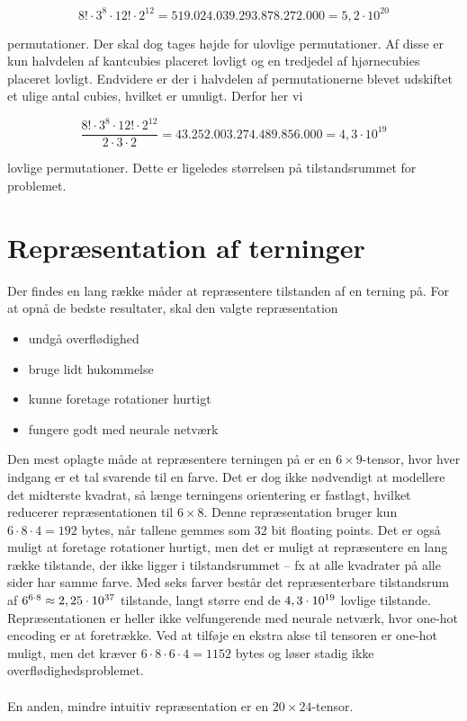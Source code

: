 \documentclass[../main.tex]{subfiles}
\begin{document}
$$8!\cdot3^8\cdot12!\cdot2^{12}=519.024.039.293.878.272.000=5,2\cdot10^{20}$$

permutationer. Der skal dog tages højde for ulovlige permutationer. Af disse er kun halvdelen af kantcubies placeret lovligt og en tredjedel af hjørnecubies placeret lovligt. Endvidere er der i halvdelen af permutationerne blevet udskiftet et ulige antal cubies, hvilket er umuligt. Derfor her vi

$$\frac{8!\cdot3^8\cdot12!\cdot2^{12}}{2\cdot3\cdot2}=43.252.003.274.489.856.000=4,3\cdot10^{19}$$

lovlige permutationer. Dette er ligeledes størrelsen på tilstandsrummet for problemet.

\section{Repræsentation af terninger}
Der findes en lang række måder at repræsentere tilstanden af en terning på.
For at opnå de bedste resultater, skal den valgte repræsentation
\begin{itemize}
	\item undgå overflødighed
	\item bruge lidt hukommelse
	\item kunne foretage rotationer hurtigt
	\item fungere godt med neurale netværk
\end{itemize}
Den mest oplagte måde at repræsentere terningen på er en $ 6\times 9 $-tensor, hvor hver indgang er et tal svarende til en farve.
Det er dog ikke nødvendigt at modellere det midterste kvadrat, så længe terningens orientering er fastlagt, hvilket reducerer repræsentationen til $ 6\times 8 $.
Denne repræsentation bruger kun $ 6\cdot 8\cdot 4=192 $ bytes, når tallene gemmes som 32 bit floating points.
Det er også muligt at foretage rotationer hurtigt, men det er muligt at repræsentere en lang række tilstande, der ikke ligger i tilstandsrummet -- fx at alle kvadrater på alle sider har samme farve.
Med seks farver består det repræsenterbare tilstandsrum af $ 6^{6\cdot 8}\approx 2,25\cdot10^{37} $ tilstande, langt større end de $ 4,3\cdot10^{19} $ lovlige tilstande.
Repræsentationen er heller ikke velfungerende med neurale netværk, hvor one-hot encoding er at foretrække.
Ved at tilføje en ekstra akse til tensoren er one-hot muligt, men det kræver $ 6\cdot 8\cdot 6\cdot 4=1152 $ bytes og løser stadig ikke overflødighedsproblemet.\\
\\
En anden, mindre intuitiv repræsentation er en $ 20\times 24 $-tensor.
\end{document}
